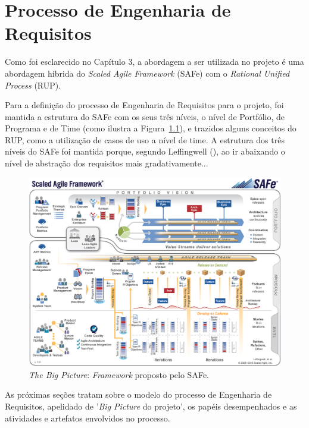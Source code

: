 \chapter[Processo de Engenharia de Requisitos]{Processo de Engenharia de Requisitos}
  
  Como foi esclarecido no Capítulo 3, a abordagem a ser utilizada no projeto é uma abordagem híbrida do 
  \textit{Scaled Agile Framework} (SAFe) com o \textit{Rational Unified Process} (RUP).
  
  Para a definição do processo de Engenharia de Requisitos para o projeto, foi mantida a estrutura do SAFe com os seus três níveis,
  o nível de Portfólio, de Programa e de Time (como ilustra a Figura~\ref{safe_big_picture}), e trazidos alguns
  conceitos do RUP, como a utilização de casos de uso a nível de time. A estrutura dos três níveis do SAFe foi mantida porque,
  segundo Leffingwell (\citeyear{leffingwell11}), ao ir abaixando o nível de abstração dos requisitos mais gradativamente...
  
  \begin{figure}[!htbp]
    \centering
    \includegraphics[scale=0.13]{editaveis/figuras/SAFe_Big_Picture}
    \caption[The SAFe Big Picture]{\textit{The Big Picture}: \textit{Framework} proposto pelo SAFe\textregistered. \footnotemark}
    \label{safe_big_picture}
  \end{figure}
  
  As próximas seções tratam sobre o modelo do processo de Engenharia de Requisitos, apelidado de '\textit{Big Picture}
  do projeto', os papéis desempenhados e as atividades e artefatos envolvidos no processo.
  
